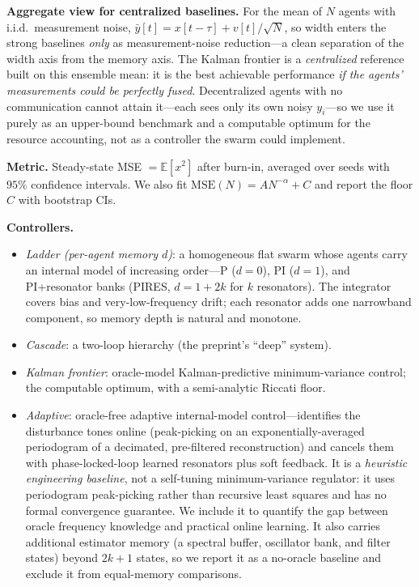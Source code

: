 \documentclass[journal]{IEEEtran}
\newcommand{\E}{\mathbb{E}}
\begin{document}
\textbf{Aggregate view for centralized baselines.} For the mean of $N$ agents
with i.i.d.\ measurement noise, $\bar{y}[t] = x[t-\tau] + v[t]/\sqrt{N}$, so
width enters the strong baselines \emph{only} as measurement-noise reduction---a
clean separation of the width axis from the memory axis. The Kalman frontier is
a \emph{centralized} reference built on this ensemble mean: it is the best
achievable performance \emph{if the agents' measurements could be perfectly
fused}. Decentralized agents with no communication cannot attain it---each sees
only its own noisy $y_i$---so we use it purely as an upper-bound benchmark and a
computable optimum for the resource accounting, not as a controller the swarm
could implement.

\textbf{Metric.} Steady-state MSE $=\E[x^2]$ after burn-in, averaged over seeds
with $95\%$ confidence intervals. We also fit $\mathrm{MSE}(N)=A N^{-\alpha}+C$
and report the floor $C$ with bootstrap CIs.

\textbf{Controllers.}
\begin{itemize}
\item \emph{Ladder (per-agent memory $d$)}: a homogeneous flat swarm whose
agents carry an internal model of increasing order---P ($d{=}0$), PI ($d{=}1$),
and PI+resonator banks (PIRES, $d = 1 + 2k$ for $k$ resonators). The integrator
covers bias and very-low-frequency drift; each resonator adds one narrowband
component, so memory depth is natural and monotone.
\item \emph{Cascade}: a two-loop hierarchy (the preprint's ``deep'' system).
\item \emph{Kalman frontier}: oracle-model Kalman-predictive minimum-variance
control; the computable optimum, with a semi-analytic Riccati floor.
\item \emph{Adaptive}: oracle-free adaptive internal-model control---identifies
the disturbance tones online (peak-picking on an exponentially-averaged
periodogram of a decimated, pre-filtered reconstruction) and cancels them with
phase-locked-loop learned resonators plus soft feedback. It is a \emph{heuristic engineering baseline}, not a self-tuning
minimum-variance regulator: it uses periodogram peak-picking rather than
recursive least squares and has no formal convergence guarantee. We include it
to quantify the gap between oracle frequency knowledge and practical online
learning. It also carries additional estimator memory (a spectral buffer,
oscillator bank, and filter states) beyond $2k{+}1$ states, so we report it as a
no-oracle baseline and exclude it from equal-memory comparisons.
\end{itemize}
\end{document}

